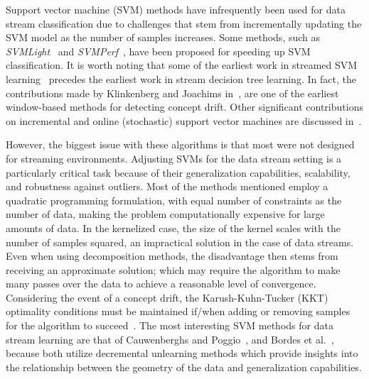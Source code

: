 \documentclass[reqno]{vcuthesis}
\numberwithin{equation}{chapter}
\begin{document}
Support vector machine (SVM) methods have infrequently been used for data stream classification due to challenges that stem from incrementally updating the SVM model as the number of samples increases. Some methods, such as \textit{SVMLight}~\cite{Joachims1999} and \textit{SVMPerf}~\cite{joachims2006training}, have been proposed for speeding up SVM classification. It is worth noting that some of the earliest work in streamed SVM learning~\cite{klinkenberg2000detecting,syed1999handling} precedes the earliest work in stream decision tree learning. In fact, the contributions made by Klinkenberg and Joachims in~\cite{klinkenberg2000detecting}, are one of the earliest window-based methods for detecting concept drift. Other significant contributions on incremental and online (stochastic) support vector machines are discussed in~\cite{bordes2005fast,cauwenberghs2001incremental,domeniconi2001incremental,fung2002incremental,ralaivola2001incremental,ruping2001incremental,shilton2005incremental}.

However, the biggest issue with these algorithms is that most were not designed for streaming environments. Adjusting SVMs for the data stream setting is a particularly critical task because of their generalization capabilities, scalability, and robustness against outliers. Most of the methods mentioned employ a quadratic programming formulation, with equal number of constraints as the number of data, making the problem computationally expensive for large amounts of data. In the kernelized case, the size of the kernel scales with the number of samples squared, an impractical solution in the case of data streams. Even when using decomposition methods, the disadvantage then stems from receiving an approximate solution; which may require the algorithm to make many passes over the data to achieve a reasonable level of convergence. Considering the event of a concept drift, the Karush-Kuhn-Tucker (KKT) optimality conditions must be maintained if/when adding or removing samples for the algorithm to succeed~\cite{aggarwal,lawal2017adaptive}. The most interesting SVM methods for data stream learning are that of Cauwenberghs and Poggio~\cite{cauwenberghs2001incremental}, and Bordes et al.~\cite{bordes2005fast}, because both utilize decremental unlearning methods which provide insights into the relationship between the geometry of the data and generalization capabilities.
\end{document}
